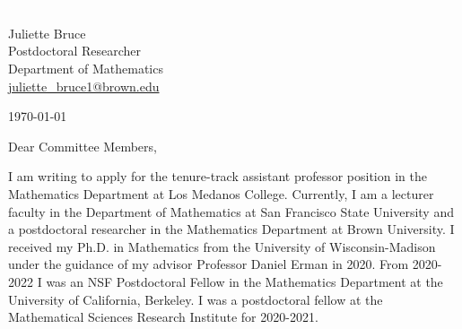 \documentclass[11pt]{article}
\begin{document}
\section*{}

\noindent
\begin{minipage}{0.99\textwidth}
\begin{minipage}{0.69\textwidth}
\textcolor{white}{.}
\end{minipage}
\begin{minipage}{0.29\textwidth}
{
Juliette Bruce \\
Postdoctoral Researcher \\
Department of Mathematics \\
\href{mailto:juliette\_bruce1@brown.edu}{juliette\_bruce1@brown.edu}
}

\vspace{12pt}
\today
\end{minipage}
\end{minipage}


\vspace{12pt}
\noindent
Dear Committee Members,

I am writing to apply for the tenure-track assistant professor position in the Mathematics Department at Los Medanos College. Currently, I am a lecturer faculty in the Department of Mathematics at San Francisco State University and a postdoctoral researcher in the Mathematics Department at Brown University. I received my Ph.D. in Mathematics from the University of Wisconsin-Madison under the guidance of my advisor Professor Daniel Erman in 2020. From 2020-2022 I was an NSF Postdoctoral Fellow in the Mathematics Department at the University of California, Berkeley. I was a postdoctoral fellow at the Mathematical Sciences Research Institute for 2020-2021.
\end{document}
